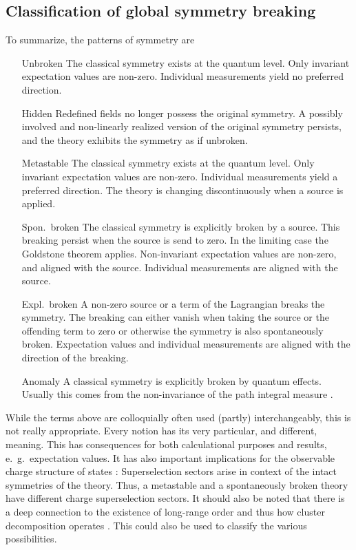\documentclass[final,twoside,12pt]{article}
\newcommand*{\1}{1\!\!\!\bot}
\begin{document}
\subsection{Classification of global symmetry breaking}\label{ss:classificationsb}

To summarize, the patterns of symmetry are
\begin{itemize}[leftmargin=0.1\textwidth]
 \item[Unbroken] The classical symmetry exists at the quantum level. Only invariant expectation values are non-zero. Individual measurements yield no preferred direction.
 \item[Hidden] Redefined fields no longer possess the original symmetry. A possibly involved and non-linearly realized version of the original symmetry persists, and the theory exhibits the symmetry as if unbroken.
 \item[Metastable] The classical symmetry exists at the quantum level. Only invariant expectation values are non-zero. Individual measurements yield a preferred direction. The theory is changing discontinuously when a source is applied.
 \item[Spon.\ broken] The classical symmetry is explicitly broken by a source. This breaking persist when the source is send to zero. In the limiting case the Goldstone theorem applies. Non-invariant expectation values are non-zero, and aligned with the source. Individual measurements are aligned with the source.
 \item[Expl.\ broken] A non-zero source or a term of the Lagrangian breaks the symmetry. The breaking can either vanish when taking the source or the offending term to zero or otherwise the symmetry is also spontaneously broken. Expectation values and individual measurements are aligned with the direction of the breaking.
 \item[Anomaly] A classical symmetry is explicitly broken by quantum effects. Usually this comes from the non-invariance of the path integral measure \cite{Bertlmann:1996xk}.
\end{itemize}
While the terms above are colloquially often used (partly) interchangeably, this is not really appropriate. Every notion has its very particular, and different, meaning. This has consequences for both calculational purposes and results, e.\ g.\ expectation values. It has also important implications for the observable charge structure of states \cite{Strocchi:2005yk}: Superselection sectors arise in context of the intact symmetries of the theory. Thus, a metastable and a spontaneously broken theory have different charge superselection sectors. It should also be noted that there is a deep connection to the existence of long-range order and thus how cluster decomposition operates \cite{Weinberg:1996kr}. This could also be used to classify the various possibilities.
\end{document}
